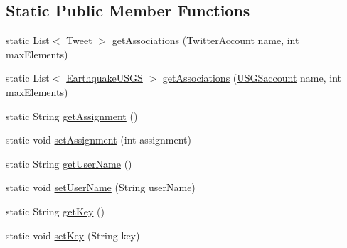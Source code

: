 \subsection*{Static Public Member Functions}
\begin{DoxyCompactItemize}
\item 
static List$<$ \hyperlink{classbridges_1_1data__src__dependent_1_1_tweet}{Tweet} $>$ \hyperlink{classbridges_1_1connect_1_1_bridges_ad8f145f95222730fad3c0628b42f0128}{get\+Associations} (\hyperlink{classbridges_1_1data__src__dependent_1_1_twitter_account}{Twitter\+Account} name, int max\+Elements)
\item 
static List$<$ \hyperlink{classbridges_1_1data__src__dependent_1_1_earthquake_u_s_g_s}{Earthquake\+U\+S\+G\+S} $>$ \hyperlink{classbridges_1_1connect_1_1_bridges_ac02211d6205c1270df11fcc271982d40}{get\+Associations} (\hyperlink{classbridges_1_1data__src__dependent_1_1_u_s_g_saccount}{U\+S\+G\+Saccount} name, int max\+Elements)
\item 
static String \hyperlink{classbridges_1_1connect_1_1_bridges_ae488b9bf0d696adb7f5a6ba7ce4ff2fd}{get\+Assignment} ()
\item 
static void \hyperlink{classbridges_1_1connect_1_1_bridges_a24c91901a59ab8b715a864ab8a4d9cdc}{set\+Assignment} (int assignment)
\item 
static String \hyperlink{classbridges_1_1connect_1_1_bridges_a5ff3fdd97d4c71c9c2141c3355e417aa}{get\+User\+Name} ()
\item 
static void \hyperlink{classbridges_1_1connect_1_1_bridges_a2d84103645662308e58a1b473d3320ae}{set\+User\+Name} (String user\+Name)
\item 
static String \hyperlink{classbridges_1_1connect_1_1_bridges_a813a1783f7b547fdb964f8af87c66f4b}{get\+Key} ()
\item 
static void \hyperlink{classbridges_1_1connect_1_1_bridges_a484992ce3fce273ca2caa215a4488e3c}{set\+Key} (String key)
\end{DoxyCompactItemize}
